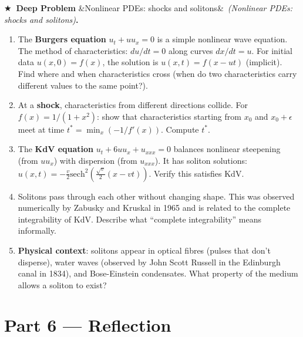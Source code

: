 \documentclass[12pt,a4paper]{article}
\newcounter{problem}
\newcounter{deepproblem}
\newenvironment{deepproblem}[1][]{\refstepcounter{deepproblem}\par\vspace{6pt}\noindent\textbf{\color{NavyBlue}$\bigstar$\ Deep Problem \thedeepproblem}\ifx&#1&\else\ \textit{(#1)}\fi\textbf{.}\enskip}{\par\vspace{4pt}}
\begin{document}
\begin{deepproblem}[Nonlinear PDEs: shocks and solitons]
\begin{enumerate}[label=(\alph*)]
  \item The \textbf{Burgers equation} $u_t + uu_x = 0$ is a simple nonlinear wave equation. The method of characteristics: $du/dt=0$ along curves $dx/dt=u$. For initial data $u(x,0)=f(x)$, the solution is $u(x,t) = f(x-ut)$ (implicit). Find where and when characteristics cross (when do two characteristics carry different values to the same point?).
  \item At a \textbf{shock}, characteristics from different directions collide. For $f(x)=1/(1+x^2)$: show that characteristics starting from $x_0$ and $x_0+\epsilon$ meet at time $t^* = \min_x(-1/f'(x))$. Compute $t^*$.
  \item The \textbf{KdV equation} $u_t + 6uu_x + u_{xxx} = 0$ balances nonlinear steepening (from $uu_x$) with dispersion (from $u_{xxx}$). It has soliton solutions: $u(x,t) = -\frac{v}{2}\text{sech}^2\left(\frac{\sqrt{v}}{2}(x-vt)\right)$. Verify this satisfies KdV.
  \item Solitons pass through each other without changing shape. This was observed numerically by Zabusky and Kruskal in 1965 and is related to the complete integrability of KdV. Describe what ``complete integrability'' means informally.
  \item \textbf{Physical context}: solitons appear in optical fibres (pulses that don't disperse), water waves (observed by John Scott Russell in the Edinburgh canal in 1834), and Bose-Einstein condensates. What property of the medium allows a soliton to exist?
\end{enumerate}
\end{deepproblem}

\section{Part 6 \texorpdfstring{---}{--} Reflection}
\end{document}
